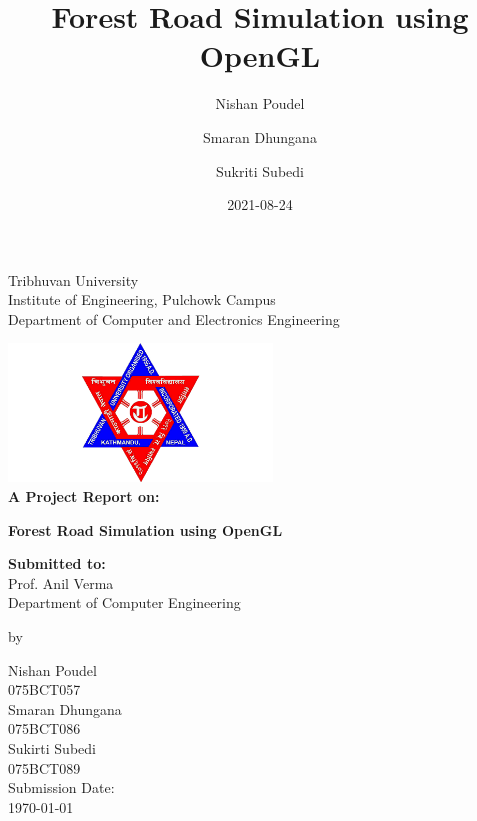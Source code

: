 \documentclass{report}
\title{Forest Road Simulation using OpenGL}
\date{2021-08-24}
\author{Nishan Poudel \and Smaran Dhungana \and Sukriti Subedi}
\begin{document}
\begin{center}
\thispagestyle{empty}
\LARGE{Tribhuvan University}\\[-0.9ex]
\LARGE{Institute of Engineering, Pulchowk Campus}\\[2ex]
\large{Department of Computer and Electronics Engineering}\\
\vspace{0.3cm}
\begin{center}
\includegraphics[width=7cm]{tu.png}\\
\vspace{0.5cm}
\textbf{\Large{A Project Report on:}}\\
\medskip\par
\textbf{\LARGE{Forest Road Simulation using OpenGL}}
\medskip\par
\vspace{0.7cm}
\Large{\textbf{Submitted to:}}\\[-0.5ex]
\large{Prof. Anil Verma}\\[-1.5ex]
\large{Department of Computer Engineering}
\bigskip\par
by \par
\large{Nishan Poudel }\\[-1ex]
\large{075BCT057}\\ [-1ex]
\vspace{0.6cm}
\large{Smaran Dhungana }\\[-1ex]
\large{075BCT086}\\ [-1ex]
\vspace{0.6cm}
\large{Sukirti Subedi }\\[-1ex]
\large{075BCT089}\\ [-1ex]
\vspace{0.6cm}
\large{ Submission Date: }\\[-1ex]
\large{\today}
\vspace{0.6cm}
\end{center}
\end{center}


\maketitle
\end{document}
